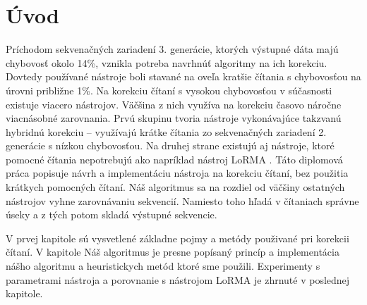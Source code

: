 \chapter*{Úvod}

Príchodom sekvenačných zariadení 3. generácie, ktorých výstupné dáta majú chybovosť okolo 14\%, vznikla potreba navrhnúť algoritmy na ich korekciu. Dovtedy používané nástroje boli stavané na oveľa kratšie čítania s chybovosťou na úrovni približne 1\%. Na korekciu čítaní s vysokou chybovosťou v súčasnosti existuje viacero nástrojov. Väčšina z nich využíva na korekciu časovo náročne viacnásobné zarovnania. Prvú skupinu tvoria nástroje vykonávajúce takzvanú hybridnú korekciu -- využívajú krátke čítania zo sekvenačných zariadení 2. generácie s nízkou chybovosťou. Na druhej strane existujú aj nástroje, ktoré pomocné čítania nepotrebujú ako napríklad nástroj LoRMA \citep{salmela2016accurate}. Táto diplomová práca popisuje návrh a implementáciu nástroja na korekciu čítaní, bez použitia krátkych pomocných čítaní. Náš algoritmus sa na rozdiel od väčšiny ostatných nástrojov vyhne zarovnávaniu sekvencií. Namiesto toho hľadá v čítaniach správne úseky a z tých potom skladá výstupné sekvencie.

V prvej kapitole sú vysvetlené základne pojmy a metódy použivané pri korekcii čítaní. V kapitole Náš algoritmus je presne popísaný princíp a implementácia nášho algoritmu a heuristickych metód ktoré sme použili. Experimenty s parametrami nástroja a porovnanie s nástrojom LoRMA je zhrnuté v poslednej kapitole.